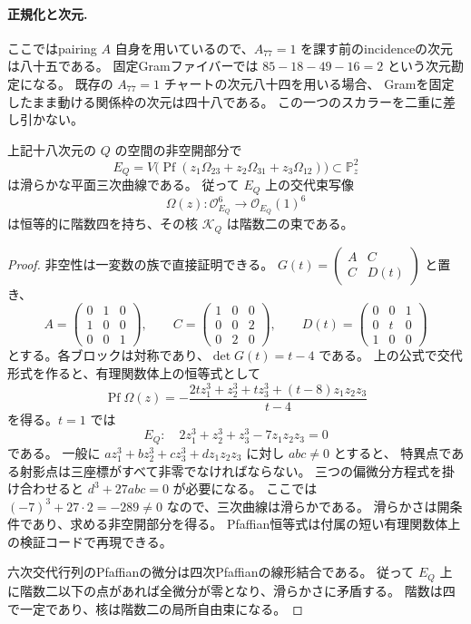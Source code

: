 \paragraph{正規化と次元.}
ここではpairing $A$ 自身を用いているので、$A_{77}=1$ を課す前のincidenceの次元は八十五である。
固定Gramファイバーでは
$85-18-49-16=2$ という次元勘定になる。
既存の $A_{77}=1$ チャートの次元八十四を用いる場合、
Gramを固定したまま動ける関係枠の次元は四十八である。
この一つのスカラーを二重に差し引かない。

\begin{proposition}[補助Pfaffian三次曲線の滑らかさ]
\label{prop:auxiliary-pfaffian-cubic-v26}
上記十八次元の $Q$ の空間の非空開部分で
\[
 E_Q=V\bigl(\operatorname{Pf}(z_1\Omega_{23}+z_2\Omega_{31}+z_3\Omega_{12})\bigr)
 \subset\mathbb P^2_z
\]
は滑らかな平面三次曲線である。
従って $E_Q$ 上の交代束写像
\[
 \Omega(z):\mathcal O_{E_Q}^{6}\longrightarrow\mathcal O_{E_Q}(1)^{6}
\]
は恒等的に階数四を持ち、その核 $\mathcal K_Q$ は階数二の束である。
\end{proposition}

\begin{proof}
非空性は一変数の族で直接証明できる。
$G(t)=\left(\begin{smallmatrix}A&C\\ C&D(t)\end{smallmatrix}\right)$ と置き、
\[
 A=\begin{pmatrix}0&1&0\\1&0&0\\0&0&1\end{pmatrix},\qquad
 C=\begin{pmatrix}1&0&0\\0&0&2\\0&2&0\end{pmatrix},\qquad
 D(t)=\begin{pmatrix}0&0&1\\0&t&0\\1&0&0\end{pmatrix}
\]
とする。各ブロックは対称であり、$\det G(t)=t-4$ である。
上の公式で交代形式を作ると、有理関数体上の恒等式として
\[
 \operatorname{Pf}\Omega(z)
 =-\frac{2tz_1^3+z_2^3+tz_3^3+(t-8)z_1z_2z_3}{t-4}
\]
を得る。$t=1$ では
\[
 E_Q:\quad 2z_1^3+z_2^3+z_3^3-7z_1z_2z_3=0
\]
である。
一般に $az_1^3+bz_2^3+cz_3^3+dz_1z_2z_3$ に対し $abc\ne0$ とすると、
特異点である射影点は三座標がすべて非零でなければならない。
三つの偏微分方程式を掛け合わせると $d^3+27abc=0$ が必要になる。
ここでは $(-7)^3+27\cdot2=-289\ne0$ なので、三次曲線は滑らかである。
滑らかさは開条件であり、求める非空開部分を得る。
Pfaffian恒等式は付属の短い有理関数体上の検証コードで再現できる。

六次交代行列のPfaffianの微分は四次Pfaffianの線形結合である。
従って $E_Q$ 上に階数二以下の点があれば全微分が零となり、滑らかさに矛盾する。
階数は四で一定であり、核は階数二の局所自由束になる。
\end{proof}

